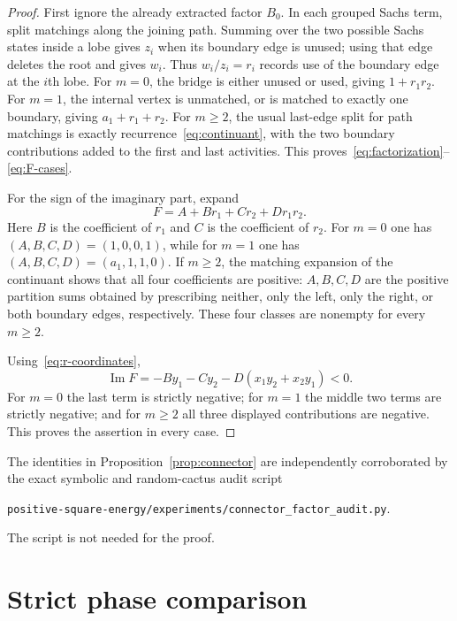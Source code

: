 \documentclass[11pt]{article}
\theoremstyle{remark}
\begin{document}
\begin{proof}
First ignore the already extracted factor $B_0$.  In each grouped Sachs term,
split matchings along the joining path.  Summing over the two possible Sachs
states inside a lobe gives $z_i$ when its boundary edge is unused; using that
edge deletes the root and gives $w_i$.  Thus $w_i/z_i=r_i$ records use of the
boundary edge at the $i$th lobe.  For $m=0$, the bridge is either unused or used, giving
$1+r_1r_2$.  For $m=1$, the internal vertex is unmatched, or is matched to
exactly one boundary, giving $a_1+r_1+r_2$.  For $m\geq2$, the usual last-edge
split for path matchings is exactly recurrence~\eqref{eq:continuant}, with
the two boundary contributions added to the first and last activities.  This
proves~\eqref{eq:factorization}--\eqref{eq:F-cases}.

For the sign of the imaginary part, expand
\begin{equation}\label{eq:ABCD}
 F=A+Br_1+Cr_2+Dr_1r_2.
\end{equation}
Here $B$ is the coefficient of $r_1$ and $C$ is the coefficient of $r_2$.
For $m=0$ one has $(A,B,C,D)=(1,0,0,1)$, while for $m=1$ one has
$(A,B,C,D)=(a_1,1,1,0)$.  If $m\geq2$, the matching expansion of the
continuant shows that all four coefficients are positive: $A,B,C,D$ are the
positive partition sums obtained by prescribing neither, only the left,
only the right, or both boundary edges, respectively.  These four classes
are nonempty for every $m\geq2$.

Using~\eqref{eq:r-coordinates},
\begin{equation}\label{eq:ImF}
 \operatorname{Im}F
 =-By_1-Cy_2-D(x_1y_2+x_2y_1)<0.
\end{equation}
For $m=0$ the last term is strictly negative; for $m=1$ the middle two terms
are strictly negative; and for $m\geq2$ all three displayed contributions
are negative.  This proves the assertion in every case.
\end{proof}

The identities in Proposition~\ref{prop:connector} are independently
corroborated by the exact symbolic and random-cactus audit script
\begin{center}
\texttt{positive-square-energy/experiments/connector\_factor\_audit.py}.
\end{center}
The script is not needed for the proof.

\section{Strict phase comparison}
\end{document}
